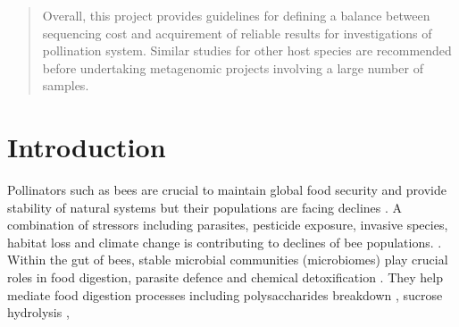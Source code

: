 \documentclass[11pt]{article}
\begin{document}
\begin{abstract}
    Overall, this project provides guidelines for defining a balance between sequencing cost and acquirement of reliable results for investigations of pollination system. 
    Similar studies for other host species are recommended before undertaking metagenomic projects involving a large number of samples. 
  \end{abstract}

  \section{Introduction}
  Pollinators such as bees are crucial to maintain global food security and provide stability of natural systems \citep{hristov2020significance,bansch2021crop,khalifa2021overview} but their populations are facing declines \citep{brown2009conservation,hristov2020factors,cheng2021ecology,zattara2021worldwide}. 
  A combination of stressors including parasites, pesticide exposure, invasive species, habitat loss and climate change is contributing to declines of bee populations. \citep{brown2009conservation,hristov2020factors,cheng2021ecology,zattara2021worldwide}.
  \newline
  Within the gut of bees, stable microbial communities (microbiomes) play crucial roles in food digestion, parasite defence and chemical detoxification \citep{moran2015genomics,engel2016bee,raymann2018role}. 
  They help mediate food digestion processes including 
  polysaccharides breakdown \citep{zheng2019division}, sucrose hydrolysis \citep{engel2012functional,lee2015saccharide}, 
\end{document}
